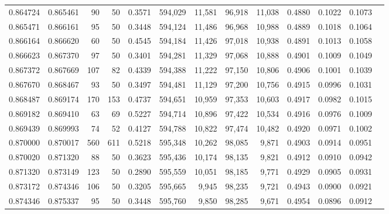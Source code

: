 \begin{tabular}{rrrrrrrrrrrrr}
0.864724 & 0.865461 &    90 &  50 &                                     0.3571 & 594,029 &  11,581 &  96,918 &  11,038 & 0.4880 & 0.1022 & 0.1073 \\
0.865471 & 0.866161 &    95 &  50 &                                     0.3448 & 594,124 &  11,486 &  96,968 &  10,988 & 0.4889 & 0.1018 & 0.1064 \\
0.866164 & 0.866620 &    60 &  50 &                                     0.4545 & 594,184 &  11,426 &  97,018 &  10,938 & 0.4891 & 0.1013 & 0.1058 \\
0.866623 & 0.867370 &    97 &  50 &                                     0.3401 & 594,281 &  11,329 &  97,068 &  10,888 & 0.4901 & 0.1009 & 0.1049 \\
0.867372 & 0.867669 &   107 &  82 &                                     0.4339 & 594,388 &  11,222 &  97,150 &  10,806 & 0.4906 & 0.1001 & 0.1039 \\
0.867670 & 0.868467 &    93 &  50 &                                     0.3497 & 594,481 &  11,129 &  97,200 &  10,756 & 0.4915 & 0.0996 & 0.1031 \\
0.868487 & 0.869174 &   170 & 153 &                                     0.4737 & 594,651 &  10,959 &  97,353 &  10,603 & 0.4917 & 0.0982 & 0.1015 \\
0.869182 & 0.869410 &    63 &  69 &                                     0.5227 & 594,714 &  10,896 &  97,422 &  10,534 & 0.4916 & 0.0976 & 0.1009 \\
0.869439 & 0.869993 &    74 &  52 &                                     0.4127 & 594,788 &  10,822 &  97,474 &  10,482 & 0.4920 & 0.0971 & 0.1002 \\
0.870000 & 0.870017 &   560 & 611 &                                     0.5218 & 595,348 &  10,262 &  98,085 &   9,871 & 0.4903 & 0.0914 & 0.0951 \\
0.870020 & 0.871320 &    88 &  50 &                                     0.3623 & 595,436 &  10,174 &  98,135 &   9,821 & 0.4912 & 0.0910 & 0.0942 \\
0.871320 & 0.873149 &   123 &  50 &                                     0.2890 & 595,559 &  10,051 &  98,185 &   9,771 & 0.4929 & 0.0905 & 0.0931 \\
0.873172 & 0.874346 &   106 &  50 &                                     0.3205 & 595,665 &   9,945 &  98,235 &   9,721 & 0.4943 & 0.0900 & 0.0921 \\
0.874346 & 0.875337 &    95 &  50 &                                     0.3448 & 595,760 &   9,850 &  98,285 &   9,671 & 0.4954 & 0.0896 & 0.0912 \\

\end{tabular}
